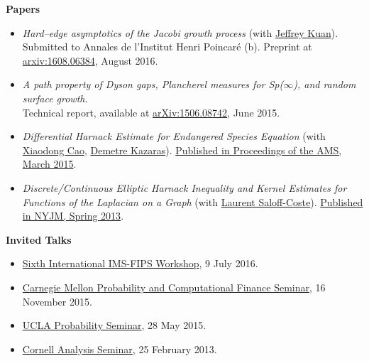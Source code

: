 \documentclass[letterpaper,11pt]{article}
\newcommand{\resheading}[1]{{\large {\textbf{#1 \vphantom{p\^{E}}}}}}
\begin{document}
\resheading{Papers}

\begin{itemize}
	\item \textit{Hard--edge asymptotics of the Jacobi growth process} (with \href{http://www.math.columbia.edu/~kuan/}{Jeffrey Kuan}). \\Submitted to Annales de l'Institut Henri Poincar\'{e} (b). Preprint at \href{https://arxiv.org/abs/1608.06384}{arxiv:1608.06384}, August 2016.
	\item \textit{A path property of Dyson gaps, Plancherel measures for Sp($\infty$), and random surface growth}. \\ Technical report, available at \href{https://arxiv.org/abs/1506.08742}{arXiv:1506.08742}, June 2015.
  \item \textit{Differential Harnack Estimate for Endangered Species Equation} (with \href{http://www.math.cornell.edu/~cao/}{Xiaodong Cao}, \href{http://pages.uoregon.edu/demetre/}{Demetre Kazaras}). \href{http://www.ams.org/journals/proc/2015-143-10/S0002-9939-2015-12576-2/}{Published in Proceedings of the AMS, March 2015}.
  \item \textit{Discrete/Continuous Elliptic Harnack Inequality and Kernel Estimates for Functions of the Laplacian on a Graph} (with \href{http://www.math.cornell.edu/~lsc/lau.html}{Laurent Saloff-Coste}). \href{http://www.emis.de/journals/NYJM/j/2013/19-25.html}{Published in NYJM, Spring 2013}.
\end{itemize}

\resheading{Invited Talks}

\begin{itemize}
	\item \href{http://www.mathfinance2016.com/}{Sixth International IMS-FIPS Workshop}, 9 July 2016. 
	\item \href{http://www.math.cmu.edu/CCF/ccfseminar.php?SeminarSelect=1150}{Carnegie Mellon Probability and Computational Finance Seminar}, 16 November 2015.
	\item \href{https://secure.math.ucla.edu/seminars/display.php?&id=831548}{UCLA Probability Seminar}, 28 May 2015.
	\item \href{http://www.math.cornell.edu/m/node/2088}{Cornell Analysis Seminar}, 25 February 2013.
\end{itemize}
\end{document}
